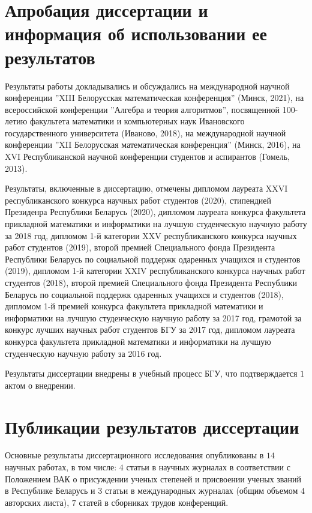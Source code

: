 \documentclass[_00_dissertation.tex]{subfiles}
\begin{document}
\section*{Апробация диссертации и информация об использовании ее результатов}

Результаты работы докладывались и обсуждались на международной научной конференции ''XIII Белорусская математическая конференция'' (Минск, 2021), на всероссийской конференции ''Алгебра и теория алгоритмов'', посвященной 100-летию факультета математики и компьютерных наук Ивановского государственного университета (Иваново, 2018), на международной научной конференции ''XII Белорусская математическая конференция'' (Минск, 2016), на XVI Республиканской научной конференции студентов и аспирантов (Гомель, 2013).

Результаты, включенные в диссертацию, отмечены дипломом лауреата XXVI республиканского конкурса научных работ студентов (2020), стипендией Президенра Республики Беларусь (2020), дипломом лауреата конкурса факультета прикладной математики и информатики на лучшую студенческую научную работу за 2018 год, дипломом 1-й категории XXV республиканского конкурса научных работ студентов (2019), второй премией Специального фонда Президента Республики Беларусь по социальной поддержк одаренных учащихся и студентов (2019), дипломом 1-й категории XXIV республиканского конкурса научных работ студентов (2018), второй премией Специального фонда Президента Республики Беларусь по социальной поддержк одаренных учащихся и студентов (2018), дипломом 1-й премией конкурса факультета прикладной математики и информатики на лучшую студенческую научную работу за 2017 год, грамотой за конкурс лучших научных работ студентов БГУ за 2017 год, дипломом лауреата конкурса факультета прикладной математики и информатики на лучшую студенческую научную работу за 2016 год.

Результаты диссертации внедрены в учебный процесс БГУ, что подтверждается $1$ актом о внедрении.

\section*{Публикации результатов диссертации}

Основные результаты диссертационного исследования опубликованы в $14$ научных работах, в том числе: $4$ статьи в научных журналах в соответствии с Положением ВАК о присуждении ученых степеней и присвоении ученых званий в Республике Беларусь и $3$ статьи в международных журналах (общим объемом $4$ авторских листа), $7$ статей в сборниках трудов конференций.
\end{document}
